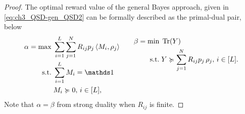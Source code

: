 \begin{proof}

The optimal reward value of the general Bayes approach, given in \eqref{eq:ch3_QSD-gen_QSD2} can be formally described as the primal-dual pair, below 
\begin{equation}
\label{prog:ch3_QSD-P_D}
        \begin{aligned}
            \alpha = \max \; & \sum_{i=1}^L \sum_{j=1}^N R_{ij} p_j \inner{M_i}{\rho_j} \\
            \suchthat \; & \sum_{i=1}^L M_i = \id \\
            & M_i \succcurlyeq 0, \, i \in [L],
        \end{aligned}
\qquad
        \begin{aligned}
            \beta = \min \; & \Tr(Y) \\
            \suchthat \; & Y \succcurlyeq \sum_{j=1}^N R_{ij} p_j\, \rho_j, \, i \in [L]. \\
            & \phantom{N} \\ 
            & \phantom{N} 
        \end{aligned}
\end{equation}
Note that $\alpha = \beta$ from strong duality when $R_{ij}$ is finite.


\end{proof}

